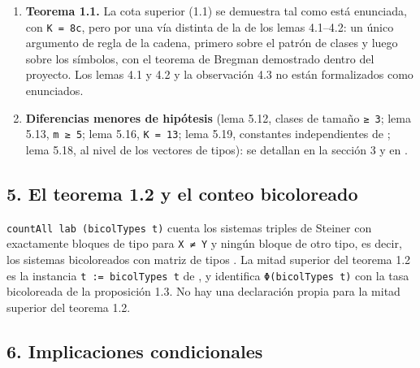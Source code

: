 \documentclass[spanish,11pt,a4paper]{article}
\begin{document}
\begin{enumerate}
\item
  \textbf{Teorema 1.1.} La cota superior (1.1) se demuestra tal como está enunciada, con \texttt{K\ =\ 8c}, pero por una vía distinta de la de los lemas 4.1--4.2: un único argumento de regla de la cadena, primero sobre el patrón de clases y luego sobre los símbolos, con el teorema de Bregman demostrado dentro del proyecto. Los lemas 4.1 y 4.2 y la observación 4.3 no están formalizados como enunciados.
\item
  \textbf{Diferencias menores de hipótesis} (lema 5.12, clases de tamaño \texttt{≥\ 3}; lema 5.13, \texttt{m\ ≥\ 5}; lema 5.16, \texttt{K\ =\ 13}; lema 5.19, constantes independientes de ; lema 5.18, al nivel de los vectores de tipos): se detallan en la sección 3 y en .
\end{enumerate}

\subsection{5. El teorema 1.2 y el conteo bicoloreado}\label{el-teorema-1.2-y-el-conteo-bicoloreado}

\texttt{countAll\ lab\ (bicolTypes\ t)} cuenta los sistemas triples de Steiner con exactamente  bloques de tipo  para \texttt{X\ ≠\ Y} y ningún bloque de otro tipo, es decir, los sistemas bicoloreados con matriz de tipos . La mitad superior del teorema 1.2 es la instancia \texttt{t\ :=\ bicolTypes\ t} de , y  identifica \texttt{Φ(bicolTypes\ t)} con la tasa bicoloreada de la proposición 1.3. No hay una declaración propia para la mitad superior del teorema 1.2.

\subsection{6. Implicaciones condicionales}\label{implicaciones-condicionales}
\end{document}
